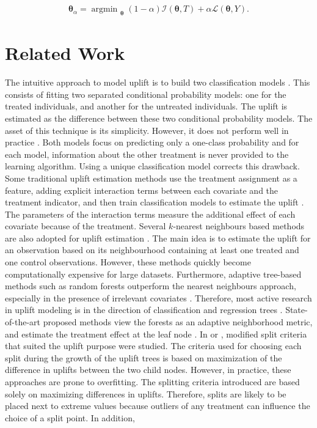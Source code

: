 \documentclass{article}
\DeclareMathOperator*{\argmin}{argmin~} %
\begin{document}
\begin{align}
    {\boldsymbol{\hat\theta}}_{\alpha} = \argmin_{\boldsymbol{\theta}} (1 - \alpha) \mathcal{I}(\boldsymbol{\theta}, T)+ \alpha  \mathcal{L}(\boldsymbol{\theta}, Y).
\end{align}




\section{Related Work}

The intuitive approach to model uplift is to build two classification models \citep{hansotia2002direct}. This consists of fitting two separated conditional probability models: one for the treated individuals, and another for the untreated individuals. The uplift is estimated as the difference between these two conditional probability models. The asset of this technique is its simplicity. However, it does not perform well in practice \citep{radcliffe2011real}. Both models focus on predicting only a one-class probability and for each model, information about the other treatment is never provided to the learning algorithm. Using a unique classification model corrects this drawback. Some traditional uplift estimation methods use the treatment assignment as a feature, adding explicit interaction terms between each covariate and the treatment indicator, and then train classification models to estimate the uplift \citep{lo2002true}. The parameters of the interaction terms measure the additional effect of each covariate because of the treatment. Several $k$-nearest neighbours \citep{cover1967nearest} based methods are also adopted for uplift estimation \citep{crump2008nonparametric, Alemi.etal-PersonalizedMedicine-2009, su2012facilitating}. The main idea is to estimate the uplift for an observation based on its neighbourhood containing at least one treated and one control observations. However, these methods quickly become computationally expensive for large datasets. Furthermore, adaptive tree-based methods such as random forests outperform the nearest neighbours approach, especially in the presence of irrelevant covariates \citep{wager2018estimation}. Therefore, most active research in uplift modeling is in the direction of classification and regression trees \citep{breiman1984classification}. State-of-the-art proposed methods view the forests as an adaptive neighborhood metric, and estimate the treatment effect at the leaf node \citep{su2009subgroup, chipman2010bart, guelman2012random}. In \cite{radcliffe1999differential, radcliffe2011real} or \cite{ hansotia2002direct, hansotia2002incremental}, modified split criteria that suited the uplift purpose were studied. The criteria used for choosing each split during the growth of the uplift trees is based on maximization of the difference in uplifts between the two child nodes. However, in practice, these approaches are prone to overfitting. The splitting criteria introduced are based solely on maximizing differences in uplifts. Therefore, splits are likely to be placed next to extreme values because outliers of any treatment can influence the choice of a split point. In addition, 
\end{document}
